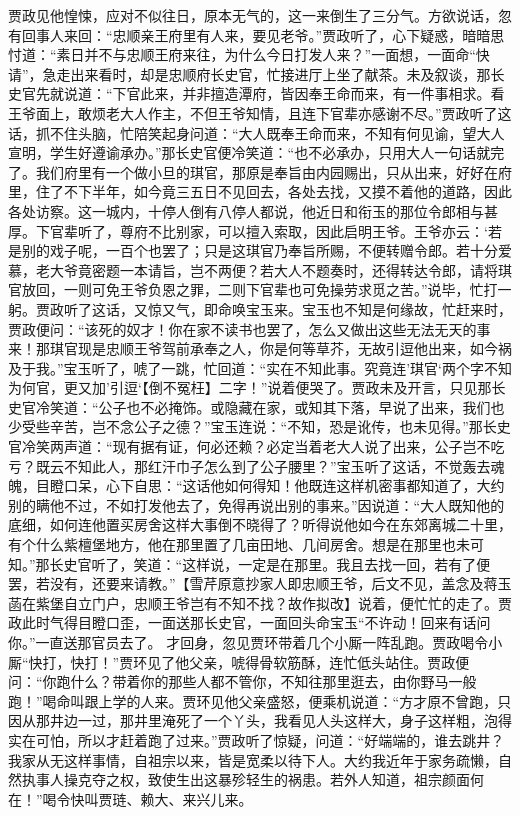 \documentclass[12pt,oneside]{book}
\begin{document}
贾政见他惶悚，应对不似往日，原本无气的，这一来倒生了三分气。方欲说话，忽有回事人来回：“忠顺亲王府里有人来，要见老爷。”贾政听了，心下疑惑，暗暗思忖道：“素日并不与忠顺王府来往，为什么今日打发人来？”一面想，一面命“快请”，急走出来看时，却是忠顺府长史官，忙接进厅上坐了献茶。未及叙谈，那长史官先就说道：“下官此来，并非擅造潭府，皆因奉王命而来，有一件事相求。看王爷面上，敢烦老大人作主，不但王爷知情，且连下官辈亦感谢不尽。”贾政听了这话，抓不住头脑，忙陪笑起身问道：“大人既奉王命而来，不知有何见谕，望大人宣明，学生好遵谕承办。”那长史官便冷笑道：“也不必承办，只用大人一句话就完了。我们府里有一个做小旦的琪官，那原是奉旨由内园赐出，只从出来，好好在府里，住了不下半年，如今竟三五日不见回去，各处去找，又摸不着他的道路，因此各处访察。这一城内，十停人倒有八停人都说，他近日和衔玉的那位令郎相与甚厚。下官辈听了，尊府不比别家，可以擅入索取，因此启明王爷。王爷亦云：‘若是别的戏子呢，一百个也罢了；只是这琪官乃奉旨所赐，不便转赠令郎。若十分爱慕，老大爷竟密题一本请旨，岂不两便？若大人不题奏时，还得转达令郎，请将琪官放回，一则可免王爷负恩之罪，二则下官辈也可免操劳求觅之苦。”说毕，忙打一躬。贾政听了这话，又惊又气，即命唤宝玉来。宝玉也不知是何缘故，忙赶来时，贾政便问：“该死的奴才！你在家不读书也罢了，怎么又做出这些无法无天的事来！那琪官现是忠顺王爷驾前承奉之人，你是何等草芥，无故引逗他出来，如今祸及于我。”宝玉听了，唬了一跳，忙回道：“实在不知此事。究竟连’琪官‘两个字不知为何官，更又加’引逗‘【倒不冤枉】二字！”说着便哭了。贾政未及开言，只见那长史官冷笑道：“公子也不必掩饰。或隐藏在家，或知其下落，早说了出来，我们也少受些辛苦，岂不念公子之德？”宝玉连说：“不知，恐是讹传，也未见得。”那长史官冷笑两声道：“现有据有证，何必还赖？必定当着老大人说了出来，公子岂不吃亏？既云不知此人，那红汗巾子怎么到了公子腰里？”宝玉听了这话，不觉轰去魂魄，目瞪口呆，心下自思：“这话他如何得知！他既连这样机密事都知道了，大约别的瞒他不过，不如打发他去了，免得再说出别的事来。”因说道：“大人既知他的底细，如何连他置买房舍这样大事倒不晓得了？听得说他如今在东郊离城二十里，有个什么紫檀堡地方，他在那里置了几亩田地、几间房舍。想是在那里也未可知。”那长史官听了，笑道：“这样说，一定是在那里。我且去找一回，若有了便罢，若没有，还要来请教。”【雪芹原意抄家人即忠顺王爷，后文不见，盖念及蒋玉菡在紫堡自立门户，忠顺王爷岂有不知不找？故作拟改】说着，便忙忙的走了。贾政此时气得目瞪口歪，一面送那长史官，一面回头命宝玉“不许动！回来有话问你。”一直送那官员去了。
才回身，忽见贾环带着几个小厮一阵乱跑。贾政喝令小厮“快打，快打！”贾环见了他父亲，唬得骨软筋酥，连忙低头站住。贾政便问：“你跑什么？带着你的那些人都不管你，不知往那里逛去，由你野马一般跑！”喝命叫跟上学的人来。贾环见他父亲盛怒，便乘机说道：“方才原不曾跑，只因从那井边一过，那井里淹死了一个丫头，我看见人头这样大，身子这样粗，泡得实在可怕，所以才赶着跑了过来。”贾政听了惊疑，问道：“好端端的，谁去跳井？我家从无这样事情，自祖宗以来，皆是宽柔以待下人。大约我近年于家务疏懒，自然执事人操克夺之权，致使生出这暴殄轻生的祸患。若外人知道，祖宗颜面何在！”喝令快叫贾琏、赖大、来兴儿来。
\end{document}
